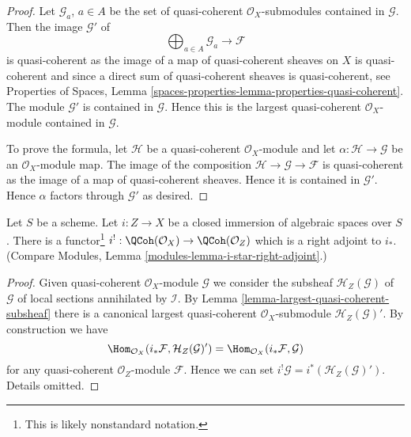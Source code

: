 \begin{proof}
Let $\mathcal{G}_a$, $a \in A$ be the set of quasi-coherent
$\mathcal{O}_X$-submodules contained in $\mathcal{G}$.
Then the image $\mathcal{G}'$ of
$$
\bigoplus\nolimits_{a \in A} \mathcal{G}_a \longrightarrow \mathcal{F}
$$
is quasi-coherent as the image of a map of quasi-coherent sheaves
on $X$ is quasi-coherent and since a direct sum of quasi-coherent sheaves
is quasi-coherent, see
Properties of Spaces,
Lemma \ref{spaces-properties-lemma-properties-quasi-coherent}.
The module $\mathcal{G}'$ is contained in $\mathcal{G}$. Hence this is the
largest quasi-coherent $\mathcal{O}_X$-module contained in $\mathcal{G}$.

\medskip\noindent
To prove the formula, let $\mathcal{H}$ be a quasi-coherent
$\mathcal{O}_X$-module and let $\alpha : \mathcal{H} \to \mathcal{G}$
be an $\mathcal{O}_X$-module map. The image of the composition
$\mathcal{H} \to \mathcal{G} \to \mathcal{F}$ is quasi-coherent
as the image of a map of quasi-coherent sheaves. Hence it is contained
in $\mathcal{G}'$. Hence $\alpha$ factors through $\mathcal{G}'$
as desired.
\end{proof}

\begin{lemma}
\label{lemma-i-upper-shriek}
Let $S$ be a scheme.
Let $i : Z \to X$ be a closed immersion of algebraic spaces over $S$.
There is a functor\footnote{This is likely nonstandard notation.}
$i^! : \QCoh(\mathcal{O}_X) \to \QCoh(\mathcal{O}_Z)$
which is a right adjoint to $i_*$. (Compare
Modules, Lemma \ref{modules-lemma-i-star-right-adjoint}.)
\end{lemma}

\begin{proof}
Given quasi-coherent $\mathcal{O}_X$-module $\mathcal{G}$ we consider
the subsheaf $\mathcal{H}_Z(\mathcal{G})$ of $\mathcal{G}$ of local sections
annihilated by $\mathcal{I}$. By
Lemma \ref{lemma-largest-quasi-coherent-subsheaf}
there is a canonical largest quasi-coherent $\mathcal{O}_X$-submodule
$\mathcal{H}_Z(\mathcal{G})'$. By construction we have
$$
\Hom_{\mathcal{O}_X}(i_*\mathcal{F}, \mathcal{H}_Z(\mathcal{G})')
=
\Hom_{\mathcal{O}_X}(i_*\mathcal{F}, \mathcal{G})
$$
for any quasi-coherent $\mathcal{O}_Z$-module $\mathcal{F}$.
Hence we can set $i^!\mathcal{G} = i^*(\mathcal{H}_Z(\mathcal{G})')$.
Details omitted.
\end{proof}








